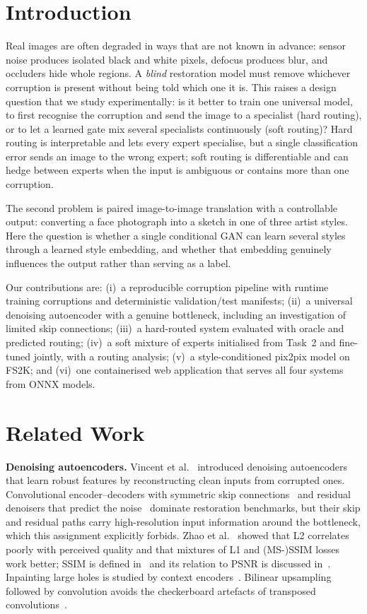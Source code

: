 \documentclass[conference]{IEEEtran}
\begin{document}
\section{Introduction}
Real images are often degraded in ways that are not known in advance: sensor noise produces isolated
black and white pixels, defocus produces blur, and occluders hide whole regions. A \emph{blind} restoration
model must remove whichever corruption is present without being told which one it is. This raises a
design question that we study experimentally: is it better to train one universal model, to first
recognise the corruption and send the image to a specialist (hard routing), or to let a learned gate mix
several specialists continuously (soft routing)? Hard routing is interpretable and lets every expert
specialise, but a single classification error sends an image to the wrong expert; soft routing is
differentiable and can hedge between experts when the input is ambiguous or contains more than one
corruption.

The second problem is paired image-to-image translation with a controllable output: converting a face
photograph into a sketch in one of three artist styles. Here the question is whether a single conditional
GAN can learn several styles through a learned style embedding, and whether that embedding genuinely
influences the output rather than serving as a label.

Our contributions are: (i)~a reproducible corruption pipeline with runtime training corruptions and
deterministic validation/test manifests; (ii)~a universal denoising autoencoder with a genuine bottleneck,
including an investigation of limited skip connections; (iii)~a hard-routed system evaluated with oracle
and predicted routing; (iv)~a soft mixture of experts initialised from Task~2 and fine-tuned jointly, with
a routing analysis; (v)~a style-conditioned pix2pix model on FS2K; and (vi)~one containerised web
application that serves all four systems from ONNX models.

\section{Related Work}
\textbf{Denoising autoencoders.} Vincent et al.~\cite{vincent2008dae,vincent2010sdae} introduced denoising
autoencoders that learn robust features by reconstructing clean inputs from corrupted ones. Convolutional
encoder--decoders with symmetric skip connections~\cite{mao2016rednet} and residual denoisers that predict
the noise~\cite{zhang2017dncnn} dominate restoration benchmarks, but their skip and residual paths carry
high-resolution input information around the bottleneck, which this assignment explicitly forbids. Zhao et
al.~\cite{zhao2017loss} showed that L2 correlates poorly with perceived quality and that mixtures of L1 and
(MS-)SSIM losses work better; SSIM is defined in~\cite{wang2004ssim} and its relation to PSNR is discussed
in~\cite{hore2010psnr}. Inpainting large holes is studied by context encoders~\cite{pathak2016context}.
Bilinear upsampling followed by convolution avoids the checkerboard artefacts of transposed
convolutions~\cite{odena2016checkerboard}.
\end{document}
